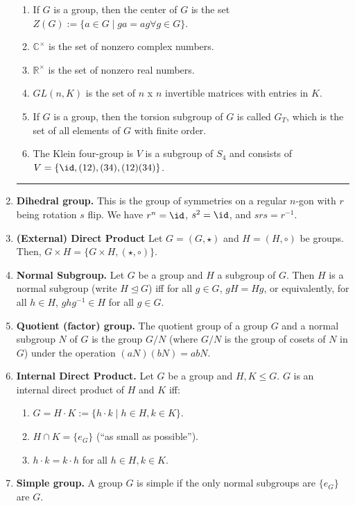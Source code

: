 \begin{enumerate}
\begin{enumerate}
		\item If $G$ is a group, then the center of $G$ is the set $Z(G) := \{a \in G \mid ga=ag \forall g \in G\}$. 
		\item $\mathbb{C}^\times$ is the set of nonzero complex numbers. 
		\item $\mathbb{R}^\times$ is the set of nonzero real numbers. 
		\item $GL(n,K)$ is the set of $n$ x $n$ invertible matrices with entries in $K$. 
		\item If $G$ is a group, then the torsion subgroup of $G$ is called $G_T$, which is the set of all elements of $G$ with finite order.
		\item The Klein four-group is $V$ is a subgroup of $S_4$ and consists of $V=\{\id, (12), (34), (12)(34)\}$. 
	\end{enumerate} 
	\begin{center}
		\hrule
	\end{center}
	\item \textbf{Dihedral group. } This is the group of symmetries on a regular $n$-gon with $r$ being rotation $s$ flip. We have $r^n = \id$, $s^2 = \id$, and $srs = r^{-1}$. 
	\item \textbf{(External) Direct Product} Let $G = (G,\star)$ and $H = (H, \circ)$ be groups. Then, $G \times H = \{G \times H, (\star, \circ)\}$. 
	\item \textbf{Normal Subgroup. } Let $G$ be a group and $H$ a subgroup of $G$. Then $H$ is a normal subgroup (write $H \unlhd G$) iff for all $g \in G$, $gH=Hg$, or equivalently, for all $h \in H$, $ghg^{-1} \in H$ for all $g \in G$. 
	\item \textbf{Quotient (factor) group. } The quotient group of a group $G$ and a normal subgroup $N$ of $G$ is the group $G/N$ (where $G/N$ is the group of cosets of $N$ in $G$) under the operation $(aN)(bN) = abN$. 
	\item \textbf{Internal Direct Product. } Let $G$ be a group and $H,K \leq G$. $G$ is an internal direct product of $H$ and $K$ iff: 
	\begin{enumerate}
		\item $G=H \cdot K := \{h \cdot k \mid h \in H, k \in K\}$. 
		\item $H \cap K = \{e_G\}$ (\enquote{as small as possible}). 
		\item $h \cdot k = k \cdot h$ for all $h \in H, k \in K$. 
	\end{enumerate}
	\item \textbf{Simple group. } A group $G$ is simple if the only normal subgroups are $\{e_G\}$ are $G$. 

\end{enumerate}
